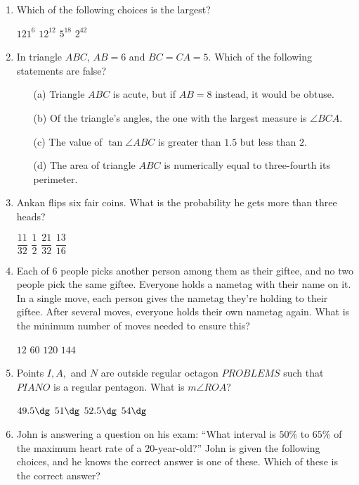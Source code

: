 \documentclass[11pt,paper=letter]{scrartcl}
\begin{document}
\begin{enumerate}
  \item Which of the following choices is the largest?

  \fourch
  {$121^6$}
  {$12^{12}$}
  {$5^{18}$}
  {$2^{42}$}

  \item In triangle $ABC$, $AB = 6$ and $BC = CA = 5$. Which of the following statements are false?
  \begin{enumerate}
    \item[(a)] Triangle $ABC$ is acute, but if $AB = 8$ instead, it would be obtuse.
    \item[(b)] Of the triangle's angles, the one with the largest measure is $\angle BCA$.
    \item[(c)] The value of $\tan \angle ABC$ is greater than $1.5$ but less than $2$.
    \item[(d)] The area of triangle $ABC$ is numerically equal to three-fourth its perimeter.
  \end{enumerate}
  \vspace{0.5em}

  \item Ankan flips six fair coins. What is the probability he gets more than three heads?

  \fourch
  {$\dfrac{11}{32}$}
  {$\dfrac12$}
  {$\dfrac{21}{32}$}
  {$\dfrac{13}{16}$}

  \item Each of $6$ people picks another person among them as their giftee, and no two people pick the same giftee. Everyone holds a nametag with their name on it. In a single move, each person gives the nametag they're holding to their giftee. After several moves, everyone holds their own nametag again. What is the minimum number of moves needed to ensure this?

  \fourch
  {$12$}
  {$60$}
  {$120$}
  {$144$}

  \item Points $I, A,$ and $N$ are outside regular octagon $PROBLEMS$ such that $PIANO$ is a regular pentagon. What is $m\angle ROA$?

  \fourch
  {$49.5\dg$}
  {$51\dg$}
  {$52.5\dg$}
  {$54\dg$}

  \item John is answering a question on his exam: ``What interval is $50\%$ to $65\%$ of the maximum heart rate of a $20$-year-old?'' John is given the following choices, and he knows the correct answer is one of these. Which of these is the correct answer?


\end{enumerate}
\end{document}
